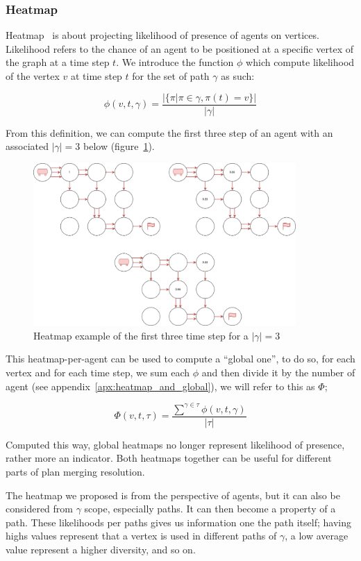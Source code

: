 \subsubsection{Heatmap}\label{sec:heatmap}

Heatmap~\cite{atstfestko20a} is about projecting likelihood of presence of agents on vertices. Likelihood refers to the chance of an agent to be positioned at a specific vertex of the graph at a time step \(t\). We introduce the function \(\phi\) which compute likelihood of the vertex \(v\) at time step \(t\) for the set of path \(\gamma\) as such:

\[
  \phi(v, t, \gamma) = \frac{ |\{ \pi | \pi \in \gamma, \pi(t) = v \}|}{|\gamma| }
\]
  
From this definition, we can compute the first three step of an agent with an associated \(|\gamma|=3\) below (figure~\ref{img:heatmap}).

\begin{figure}[H]
  \centering
  \caption{Heatmap example of the first three time step for a \(|\gamma|=3\) }\label{img:heatmap}
  \includegraphics[width=10cm]{img/heatmap.drawio.png}
\end{figure}

This heatmap-per-agent can be used to compute a ``global one'', to do so, for each vertex and for each time step, we sum each \(\phi\) and then divide it by the number of agent (see appendix~\ref{apx:heatmap_and_global}), we will refer to this as \(\Phi\);

\[
  \Phi(v,t,\tau) = \frac{ {\sum^{\gamma \in \tau} }{\phi(v,t,\gamma)}}  {|\tau|}
\]

Computed this way, global heatmaps no longer represent likelihood of presence, rather more an indicator. Both heatmaps together can be useful for different parts of plan merging resolution.

The heatmap we proposed is from the perspective of agents, but it can also be considered from \(\gamma\) scope, especially paths. It can then become a property of a path. These likelihoods per paths gives us information one the path itself; having highs values represent that a vertex is used in different paths of \(\gamma\), a low average value represent a higher diversity, and so on.

